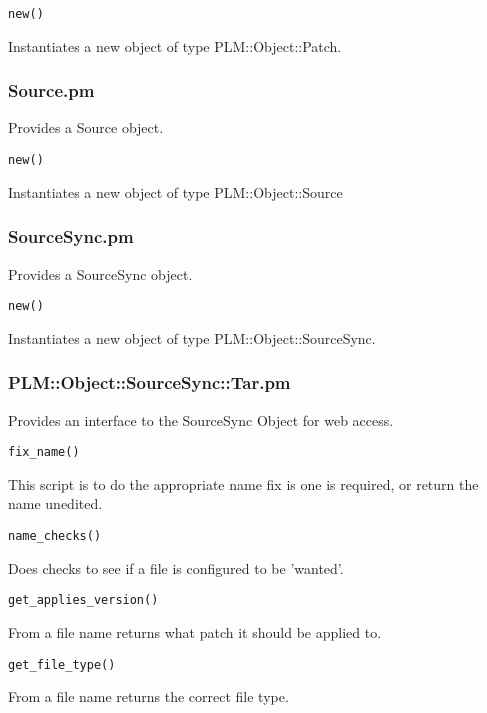 \begin{verbatim}
new()
\end{verbatim}
Instantiates a new object of type PLM::Object::Patch.

\subsubsection{Source.pm}
Provides a Source object.

\begin{verbatim}
new()
\end{verbatim}
Instantiates a new object of type PLM::Object::Source

\subsubsection{SourceSync.pm}
Provides a SourceSync object.

\begin{verbatim}
new()
\end{verbatim}
Instantiates a new object of type PLM::Object::SourceSync.

\subsubsection{PLM::Object::SourceSync::Tar.pm}
Provides an interface to the SourceSync Object for web access.

\begin{verbatim}
fix_name()
\end{verbatim}
This script is to do the appropriate name fix is one is required, or return the name unedited.

\begin{verbatim}
name_checks()
\end{verbatim}
Does checks to see if a file is configured to be 'wanted'.

\begin{verbatim}
get_applies_version()
\end{verbatim}
From a file name returns what patch it should be applied to.

\begin{verbatim}
get_file_type()
\end{verbatim}
From a file name returns the correct file type.

